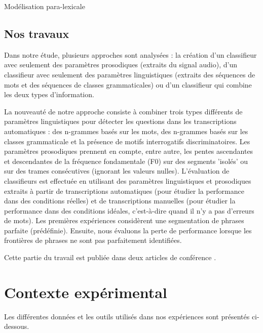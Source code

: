 \documentclass{style/these}
\let\oldcite=\cite
\renewcommand{\cite}[1]{{\fontfamily{qcs}\selectfont{\color{darkerblue}[\oldcite{#1}]}}}
\begin{document}
\begin{part}{Modélisation para-lexicale}
\section{Nos travaux}
\renewcommand{\rightmark}{Nos travaux}

Dans notre étude, plusieurs approches sont analysées : la création d'un classifieur avec seulement des paramètres prosodiques (extraits du signal audio), d'un classifieur avec seulement des paramètres linguistiques (extraits des séquences de mots et des séquences de classes grammaticales) ou d'un classifieur qui combine les deux types d'information. 

La nouveauté de notre approche consiste à combiner trois types différents de paramètres linguistiques pour détecter les questions dans les transcriptions automatiques : des n-grammes basés sur les mots, des n-grammes basés sur les classes grammaticale et la présence de motifs interrogatifs discriminatoires. 
Les paramètres prosodiques prennent en compte, entre autre, les pentes ascendantes et descendantes de la fréquence fondamentale (F0) sur des segments 'isolés' ou sur des trames consécutives (ignorant les valeurs nulles). 
L'évaluation de classifieurs est effectuée en utilisant des paramètres linguistiques et prosodiques extraits à partir de transcriptions automatiques  (pour étudier la performance dans des conditions réelles) et de transcriptions manuelles (pour étudier la performance dans des conditions idéales, c'est-à-dire quand il n'y a pas d'erreurs de mots). 
Les premières expériences considèrent une segmentation de phrases parfaite (prédéfinie). 
Ensuite, nous évaluons la perte de performance lorsque les frontières de phrases ne sont pas parfaitement identifiées.

Cette partie du travail est publiée dans deux articles de conférence \cite{Orosanu2015_1, Orosanu2015_3}.



\chapter{Contexte expérimental}
\renewcommand{\leftmark}{Contexte expérimental}
\renewcommand{\rightmark}{}

Les différentes données et les outils utilisés dans nos expériences sont présentés ci-dessous. 

\minitoc


\end{part}
\end{document}
